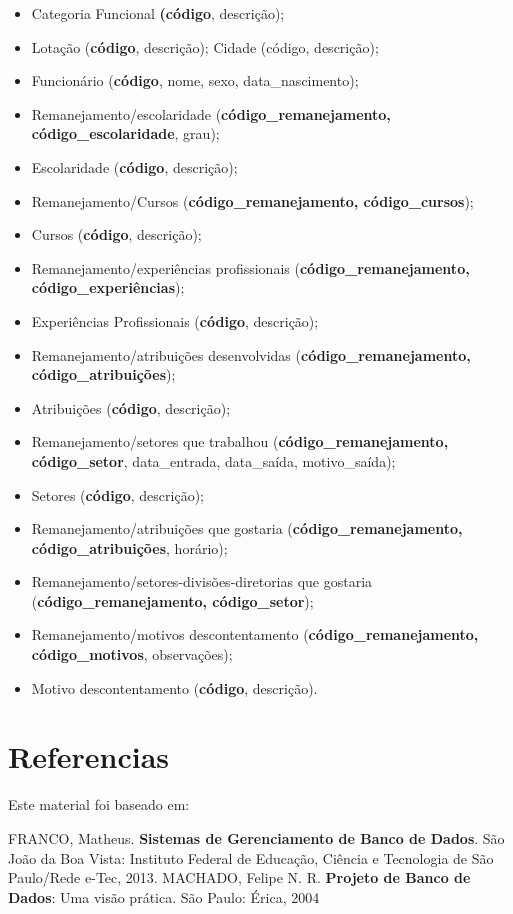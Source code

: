 \documentclass{article}
\begin{document}
\begin{itemize}
    \item Categoria Funcional \textbf{(código}, descrição);
    \item Lotação (\textbf{código}, descrição); Cidade (código, descrição);
    \item Funcionário (\textbf{código}, nome, sexo, data\_nascimento);
    \item Remanejamento/escolaridade (\textbf{código\_remanejamento, código\_escolaridade}, grau);
    \item Escolaridade (\textbf{código}, descrição);
    \item Remanejamento/Cursos (\textbf{código\_remanejamento, código\_cursos});
    \item Cursos (\textbf{código}, descrição);
    \item Remanejamento/experiências profissionais (\textbf{código\_remanejamento, código\_experiências});
    \item Experiências Profissionais (\textbf{código}, descrição);
    \item Remanejamento/atribuições desenvolvidas (\textbf{código\_remanejamento, código\_atribuições});
    \item Atribuições (\textbf{código}, descrição);
    \item Remanejamento/setores que trabalhou (\textbf{código\_remanejamento, código\_setor}, data\_entrada, data\_saída, motivo\_saída);
    \item Setores (\textbf{código}, descrição);
    \item Remanejamento/atribuições que gostaria (\textbf{código\_remanejamento, código\_atribuições}, horário);
    \item Remanejamento/setores-divisões-diretorias que gostaria (\textbf{código\_remanejamento, código\_setor});
    \item Remanejamento/motivos descontentamento (\textbf{código\_remanejamento, código\_motivos}, observações);
    \item Motivo descontentamento (\textbf{código}, descrição).
\end{itemize}


\section{Referencias }
Este material foi baseado em:

FRANCO, Matheus. \textbf{Sistemas de Gerenciamento de Banco de Dados}. São João da Boa Vista: Instituto Federal de Educação, Ciência e Tecnologia de São Paulo/Rede e-Tec, 2013.
\newline
MACHADO, Felipe N. R. \textbf{Projeto de Banco de Dados}: Uma visão prática. São Paulo: Érica, 2004
\end{document}
